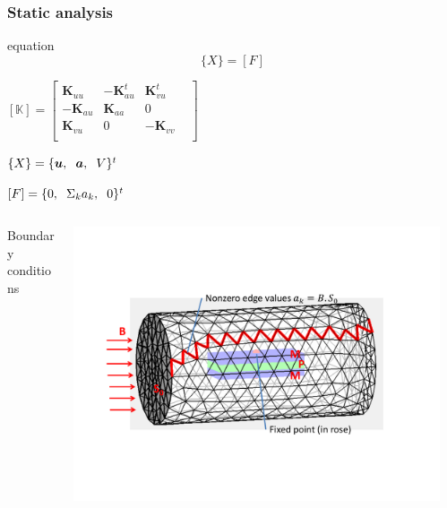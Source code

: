 \documentclass[compress]{beamer}
\begin{document}
\begin{frame}\frametitle{Static analysis}
\begin{beamercolorbox}[center]{equation}
      \begin{equation*}
		[\mathbb{K}] \{ X \}=[F]
		\end{equation*}
\end{beamercolorbox}
\begin{itemize} [label=$\bullet$, font=\small, leftmargin=*]
\begin{minipage}{0.53\linewidth}
\item  $ 
[\mathbb{K}] = \begin{bmatrix}
       \boldsymbol{K}_{uu}  & -\boldsymbol{K}^t_{au} & \boldsymbol{K}^t_{vu}          \\[0.3em]
       -\boldsymbol{K}_{au} & \boldsymbol{K}_{aa}           & 0 \\[0.3em]
       \boldsymbol{K}_{vu}         & 0 & -\boldsymbol{K}_{vv} &  \\
     \end{bmatrix}
$
\end{minipage}
\begin{minipage}{0.4\linewidth}
\item $\{ X \} = \{\boldsymbol{u},\hspace{0.2cm} \boldsymbol{a},\hspace{0.2cm} V \}^t$
\item $[F] = \{0, \hspace{0.2cm} \Sigma_k a_k, \hspace{0.2cm} 0 \}^t$
\end{minipage}
\end{itemize}
\begin{columns}[totalwidth=\textwidth] 
   \begin{column}{.25\textwidth}
   \centering
   Boundary conditions
   \end{column}
    \begin{column}{.75\textwidth}
	\includegraphics[width=0.95\textwidth]{Graphic/02_illusbdcv2.pdf}

\end{column}
\end{columns}
\end{frame}
\end{document}
